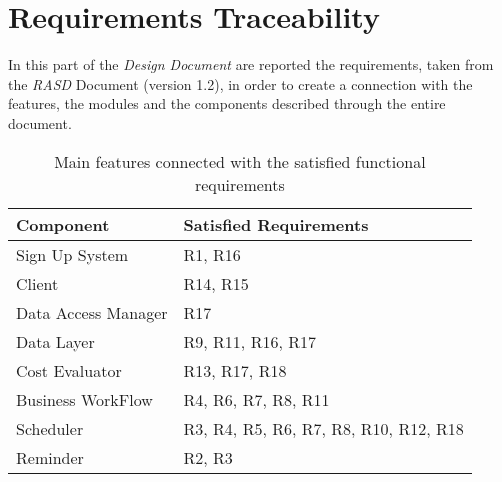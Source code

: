 \chapter{Requirements Traceability}
In this part of the \emph{Design Document} are reported the requirements, taken from the \emph{RASD} Document (version 1.2), in order to create a connection with the features, the modules and the components described through the entire document.

\renewcommand{\arraystretch}{1.5}

\begin{table}[H]
    \centering
    \begin{tabular}{p{4cm} | p{7cm}}
        \large{\textbf{Component}} & \large{\textbf{Satisfied Requirements}} \\
        \hline
        
        Sign Up System              & R1, R16                                   \\
        
        Client                      & R14, R15                                  \\
        
        Data Access Manager         & R17                                       \\
        
        Data Layer                  & R9, R11, R16, R17                         \\
        
        Cost Evaluator              & R13, R17, R18                             \\
        
        Business WorkFlow           & R4, R6, R7, R8, R11                       \\
        
        Scheduler                   & R3, R4, R5, R6, R7, R8, R10, R12, R18     \\
        
        Reminder                    & R2, R3                                    \\
    \end{tabular}
    \caption{Main features connected with the satisfied functional requirements}
\end{table}